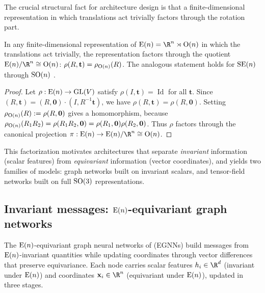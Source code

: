 The crucial structural fact for architecture design is that a finite-dimensional
representation in which translations act trivially factors through the rotation
part.

\begin{proposition}
\label{prop:groups:rep-decomposition}
In any finite-dimensional representation of $\Eucl(n) = \R^n \rtimes \OO(n)$ in
which the translations act trivially, the representation factors through the
quotient $\Eucl(n)/\R^n \cong \OO(n)$: $\rho(R, \mathbf{t}) = \rho_{\operatorname{O}(n)}(R)$.
The analogous statement holds for $\operatorname{SE}(n)$ through $\operatorname{SO}(n)$
\citep{DBLP:journals/corr/abs-2104-13478}.
\end{proposition}

\begin{proof}
Let $\rho: \operatorname{E}(n) \to \operatorname{GL}(V)$ satisfy $\rho(I, \mathbf{t}) = \operatorname{Id}$
for all $\mathbf{t}$. Since $(R, \mathbf{t}) = (R, \mathbf{0})\cdot(I, R^{-1}
\mathbf{t})$, we have $\rho(R, \mathbf{t}) = \rho(R, \mathbf{0})$. Setting
$\rho_{\operatorname{O}(n)}(R) := \rho(R, \mathbf{0})$ gives a homomorphism, because
$\rho_{\operatorname{O}(n)}(R_1 R_2) = \rho(R_1 R_2, \mathbf{0}) = \rho(R_1, \mathbf{0})
\rho(R_2, \mathbf{0})$. Thus $\rho$ factors through the canonical projection
$\pi: \Eucl(n) \to \Eucl(n)/\R^n \cong \OO(n)$.
\end{proof}

This factorization motivates architectures that separate \emph{invariant}
information (scalar features) from \emph{equivariant} information (vector
coordinates), and yields two families of models: graph networks built on
invariant scalars, and tensor-field networks built on full $\operatorname{SO}(3)$
representations.

\subsection{Invariant messages: \texorpdfstring{$\operatorname{E}(n)$}{E(n)}-equivariant graph networks}
\label{sec:groups:egnn}

The $\operatorname{E}(n)$-equivariant graph neural networks of
\citet{satorras2021enequivariant} (EGNNs) build messages from $\operatorname{E}(n)$-invariant
quantities while updating coordinates through vector differences that preserve
equivariance. Each node carries scalar features $h_i \in \R^d$ (invariant under
$\operatorname{E}(n)$) and coordinates $\mathbf{x}_i \in \R^n$ (equivariant under
$\operatorname{E}(n)$), updated in three stages.

